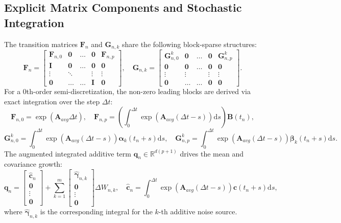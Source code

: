 \documentclass[preprint,12pt]{elsarticle}
\begin{document}
\subsection{Explicit Matrix Components and Stochastic Integration}
The transition matrices $\mathbf{F}_n$ and $\mathbf{G}_{n,k}$ share the following block-sparse structures:
\begin{equation}
\mathbf{F}_n = \begin{bmatrix} \mathbf{F}_{n,0} & \mathbf{0} & \dots & \mathbf{0} & \mathbf{F}_{n,p} \\ \mathbf{I} & \mathbf{0} & \dots & \mathbf{0} & \mathbf{0} \\ \vdots & \ddots & & \vdots & \vdots \\ \mathbf{0} & \dots & \dots & \mathbf{I} & \mathbf{0} \end{bmatrix}, \quad \mathbf{G}_{n,k} = \begin{bmatrix} \mathbf{G}_{n,0}^k & \mathbf{0} & \dots & \mathbf{0} & \mathbf{G}_{n,p}^k \\ \mathbf{0} & \mathbf{0} & \dots & \mathbf{0} & \mathbf{0} \\ \vdots & \vdots & & \vdots & \vdots \\ \mathbf{0} & \dots & \dots & \mathbf{0} & \mathbf{0} \end{bmatrix}.
\end{equation}
For a 0th-order semi-discretization, the non-zero leading blocks are derived via exact integration over the step $\Delta t$:
\begin{equation}
\mathbf{F}_{n,0} = \exp(\mathbf{A}_{avg} \Delta t), \quad \mathbf{F}_{n,p} = \left(\int_0^{\Delta t} \exp(\mathbf{A}_{avg}(\Delta t - s)) \mathrm{d}s\right) \mathbf{B}(t_n),
\end{equation}
\begin{equation}
\mathbf{G}_{n,0}^k = \int_0^{\Delta t} \exp(\mathbf{A}_{avg}(\Delta t - s)) \boldsymbol{\alpha}_k(t_n+s) \mathrm{d}s, \quad \mathbf{G}_{n,p}^k = \int_0^{\Delta t} \exp(\mathbf{A}_{avg}(\Delta t - s)) \boldsymbol{\beta}_k(t_n+s) \mathrm{d}s.
\end{equation}
The augmented integrated additive term $\mathbf{q}_n \in \mathbb{R}^{d(p+1)}$ drives the mean and covariance growth:
\begin{equation}
\mathbf{q}_n = \begin{bmatrix} \hat{\mathbf{c}}_n \\ \mathbf{0} \\ \vdots \\ \mathbf{0} \end{bmatrix} + \sum_{k=1}^m \begin{bmatrix} \hat{\boldsymbol{\gamma}}_{n,k} \\ \mathbf{0} \\ \vdots \\ \mathbf{0} \end{bmatrix} \Delta W_{n,k}, \quad \hat{\mathbf{c}}_n = \int_0^{\Delta t} \exp(\mathbf{A}_{avg}(\Delta t - s)) \mathbf{c}(t_n+s) \mathrm{d}s,
\end{equation}
where $\hat{\boldsymbol{\gamma}}_{n,k}$ is the corresponding integral for the $k$-th additive noise source.
\end{document}

